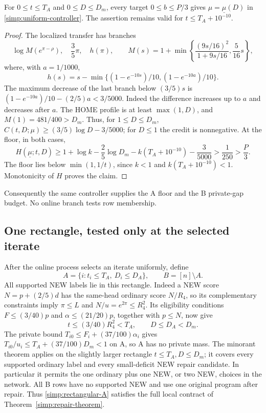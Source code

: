 \begin{lemma}
\label{simp:uniform-floor}
For $0\le t\le T_A$ and $0\le D\le D_m$, every target
$0\le b\le P/3$ gives $\mu=\underline\mu(D)$ in
\eqref{simp:uniform-controller}.
The assertion remains valid for $t\le T_A+10^{-10}$.
\end{lemma}
\begin{proof}
The localized transfer has branches
\[
 \log M(e^{\pi-\rho}),\quad \frac35\pi,\quad h(\pi),
 \qquad
 M(s)=1+\min\left\{\frac{(9s/16)^2}{1+9s/16},\frac5{16}s\right\},
\]
where, with $a=1/1000$,
\[
 h(s)=s-\min\{(1-e^{-10s})/10,(1-e^{-10a})/10\}.
\]
The maximum decrease of the last branch below $(3/5)s$ is
$(1-e^{-10a})/10-(2/5)a<3/5000$.  Indeed the difference
increases up to $a$ and decreases after $a$.
The HOME profile is at least $\max(1,D)$, and
$M(1)=481/400>D_m$.  Thus, for $1\le D\le D_m$,
$C(t,D;\mu)\ge(3/5)\log D-3/5000$; for $D\le1$ the
credit is nonnegative.  At the floor, in both cases,
\[
 H(\underline\mu;t,D)\ge
 1+\log k-\frac25\log D_m
       -k(T_A+10^{-10})-\frac3{5000}
 >\frac1{250}>\frac P3.
\]
The floor lies below $\min(1,1/t)$, since $k<1$ and
$k(T_A+10^{-10})<1$.  Monotonicity of $H$ proves the claim.
\end{proof}

Consequently the same controller supplies the A floor and the B
private-gap budget.  No online branch tests row membership.

\subsection{One rectangle, tested only at the selected iterate}

After the online process selects an iterate uniformly, define
\begin{equation}\label{simp:rectangular-A}
       A=\{i:t_i\le T_A,\ D_i\le D_A\},\qquad B=[n]\setminus A.
\end{equation}
All supported NEW labels lie in this rectangle.  Indeed a NEW score
$N=p+(2/5)d$ has the same-head ordinary score $N/R_4$, so its
complementary constraints imply $\pi\le L$ and $N/u=e^{2\pi}\le R_4^2$.
Its eligibility conditions $F\le(3/40)p$ and
$\alpha\le(21/20)p$, together with $p\le N$, now give
\[
       t\le(3/40)R_4^2<T_A,\qquad D\le D_A<D_m.
\]
The private bound $T_{i0}\le F_i+(37/100)\alpha_i$ gives
$T_{i0}/u_i\le T_A+(37/100)D_m<1$ on A, so A has no private mass.
The minorant theorem applies on the slightly larger rectangle
$t\le T_A,D\le D_m$; it covers every supported ordinary label
and every small-deficit NEW repair candidate.  In particular it
permits the one ordinary plus one NEW, or two NEW, choices in the
network.  All B rows have no supported NEW and use one original
program after repair.  Thus \eqref{simp:rectangular-A} satisfies
the full local contract of Theorem~\ref{simp:repair-theorem}.

